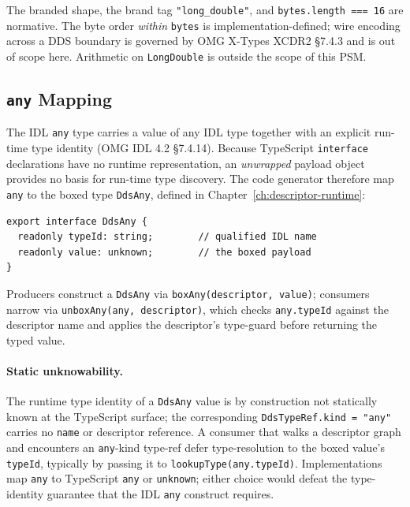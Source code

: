 \documentclass{../styles/zerodds-vendor-spec}
\begin{document}
The branded shape, the brand tag \texttt{"long\_double"}, and
\texttt{bytes.length === 16} are normative. The byte order
\emph{within} \texttt{bytes} is implementation-defined; wire
encoding across a DDS boundary is governed by OMG X-Types
XCDR2 §7.4.3 and is out of scope here. Arithmetic on
\texttt{LongDouble} is outside the scope of this PSM.

\subsection{\texttt{any} Mapping}\label{sec:any-mapping}

The IDL \texttt{any} type carries a value of any IDL type
together with an explicit run-time type identity (OMG IDL 4.2
§7.4.14). Because TypeScript \texttt{interface} declarations have
no runtime representation, an \emph{unwrapped} payload object
provides no basis for run-time type discovery. The code generator
therefore  map \texttt{any} to the boxed type
\texttt{DdsAny}, defined in Chapter~\ref{ch:descriptor-runtime}:

\begin{lstlisting}
export interface DdsAny {
  readonly typeId: string;        // qualified IDL name
  readonly value: unknown;        // the boxed payload
}
\end{lstlisting}

Producers  construct a \texttt{DdsAny} via
\texttt{boxAny(descriptor, value)}; consumers 
narrow via \texttt{unboxAny(any, descriptor)}, which checks
\texttt{any.typeId} against the descriptor name and applies the
descriptor's type-guard before returning the typed value.

\paragraph{Static unknowability.} The runtime type identity of
a \texttt{DdsAny} value is by construction not statically known
at the TypeScript surface; the corresponding
\texttt{DdsTypeRef.kind = "any"} carries no \texttt{name} or
descriptor reference. A consumer that walks a descriptor graph
and encounters an \texttt{any}-kind type-ref 
defer type-resolution to the boxed value's \texttt{typeId},
typically by passing it to \texttt{lookupType(any.typeId)}.
Implementations  map \texttt{any} to TypeScript
\texttt{any} or \texttt{unknown}; either choice would defeat the
type-identity guarantee that the IDL \texttt{any} construct
requires.
\end{document}

